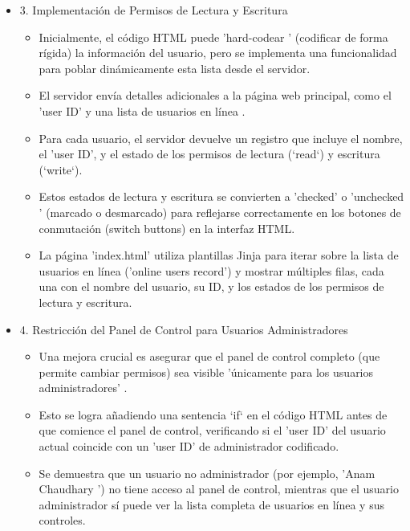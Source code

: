 \documentclass{report}
\begin{document}
\begin{itemize}
    \item 3. Implementación de Permisos de Lectura y Escritura
    \begin{itemize}
        \item Inicialmente, el código HTML puede  'hard-codear ' (codificar de forma rígida) la información del usuario, pero se implementa 
        una funcionalidad para  poblar dinámicamente esta lista  desde el servidor.
        \item El servidor envía detalles adicionales a la página web principal, como el 'user ID' y una  lista de usuarios en línea .
        \item Para cada usuario, el servidor devuelve un registro que incluye el nombre, el 'user ID', y el estado de los permisos de 
        lectura (`read`) y escritura (`write`).
        \item Estos estados de lectura y escritura se convierten a 'checked' o  'unchecked ' (marcado o desmarcado) para reflejarse 
        correctamente en los botones de conmutación (switch buttons) en la interfaz HTML.
        \item La página 'index.html' utiliza  plantillas Jinja  para iterar sobre la lista de usuarios en línea ('online users record') y 
        mostrar múltiples filas, cada una con el nombre del usuario, su ID, y los estados de los permisos de lectura y escritura.
    \end{itemize}

    \item 4. Restricción del Panel de Control para Usuarios Administradores
    \begin{itemize}
        \item Una mejora crucial es asegurar que el  panel de control completo (que permite cambiar permisos) sea visible  'únicamente para 
        los usuarios administradores' .
        \item Esto se logra añadiendo una  sentencia `if` en el código HTML  antes de que comience el panel de control, verificando si el 'user ID' 
        del usuario actual coincide con un 'user ID' de administrador codificado.
        \item Se demuestra que un usuario no administrador (por ejemplo,  'Anam Chaudhary ') no tiene acceso al panel de control, mientras que el 
        usuario administrador sí puede ver la lista completa de usuarios en línea y sus controles.
    \end{itemize}


\end{itemize}
\end{document}
